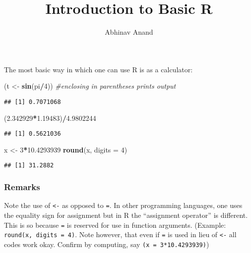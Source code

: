 \documentclass[11pt,]{article}
\title{Introduction to Basic R}
\author{Abhinav Anand}
\date{}
\newenvironment{Shaded}{\begin{snugshade}}{\end{snugshade}}
\newcommand{\KeywordTok}[1]{\textcolor[rgb]{0.13,0.29,0.53}{\textbf{#1}}}
\newcommand{\DataTypeTok}[1]{\textcolor[rgb]{0.13,0.29,0.53}{#1}}
\newcommand{\DecValTok}[1]{\textcolor[rgb]{0.00,0.00,0.81}{#1}}
\newcommand{\FloatTok}[1]{\textcolor[rgb]{0.00,0.00,0.81}{#1}}
\newcommand{\StringTok}[1]{\textcolor[rgb]{0.31,0.60,0.02}{#1}}
\newcommand{\CommentTok}[1]{\textcolor[rgb]{0.56,0.35,0.01}{\textit{#1}}}
\newcommand{\OperatorTok}[1]{\textcolor[rgb]{0.81,0.36,0.00}{\textbf{#1}}}
\newcommand{\NormalTok}[1]{#1}
\begin{document}
\maketitle

The most basic way in which one can use R is as a calculator:

\begin{Shaded}
\begin{Highlighting}[]
\NormalTok{(t <-}\StringTok{ }\KeywordTok{sin}\NormalTok{(pi}\OperatorTok{/}\DecValTok{4}\NormalTok{)) }\CommentTok{#enclosing in parentheses prints output}
\end{Highlighting}
\end{Shaded}

\begin{verbatim}
## [1] 0.7071068
\end{verbatim}

\begin{Shaded}
\begin{Highlighting}[]
\NormalTok{(}\FloatTok{2.342929}\OperatorTok{*}\FloatTok{1.19483}\NormalTok{)}\OperatorTok{/}\FloatTok{4.9802244}
\end{Highlighting}
\end{Shaded}

\begin{verbatim}
## [1] 0.5621036
\end{verbatim}

\begin{Shaded}
\begin{Highlighting}[]
\NormalTok{x <-}\StringTok{ }\DecValTok{3}\OperatorTok{*}\FloatTok{10.4293939}
\KeywordTok{round}\NormalTok{(x, }\DataTypeTok{digits =} \DecValTok{4}\NormalTok{)}
\end{Highlighting}
\end{Shaded}

\begin{verbatim}
## [1] 31.2882
\end{verbatim}

\subsubsection{Remarks}\label{remarks}

Note the use of \texttt{\textless{}-} as opposed to \texttt{=}. In other
programming languages, one uses the equality sign for assignment but in
R the ``assignment operator'' is different. This is so because
\texttt{=} is reserved for use in function arguments. (Example:
\texttt{round(x,\ digits\ =\ 4)}. Note however, that even if \texttt{=}
is used in lieu of \texttt{\textless{}-} all codes work okay. Confirm by
computing, say \texttt{(x\ =\ 3*10.4293939)})
\end{document}
